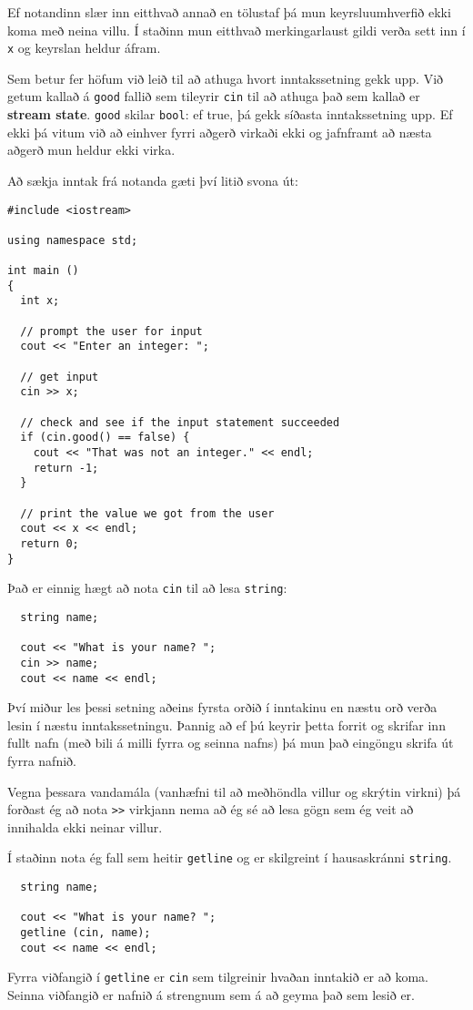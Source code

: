 
Ef notandinn slær inn eitthvað annað en tölustaf þá mun keyrsluumhverfið ekki koma með neina villu.
Í staðinn mun eitthvað merkingarlaust gildi verða sett inn í {\tt x} og keyrslan heldur áfram.

Sem betur fer höfum við leið til að athuga hvort inntakssetning gekk upp.
Við getum kallað á {\tt good} fallið sem tileyrir {\tt cin} til að athuga það sem kallað er {\bf stream state}.
{\tt good} skilar {\tt bool}: ef true, þá gekk síðasta inntakssetning upp.
Ef ekki þá vitum við að einhver fyrri aðgerð virkaði ekki og jafnframt að næsta aðgerð mun heldur ekki virka.

Að sækja inntak frá notanda gæti því litið svona út:

\begin{verbatim}
#include <iostream>

using namespace std;

int main ()
{
  int x;

  // prompt the user for input
  cout << "Enter an integer: ";

  // get input
  cin >> x;

  // check and see if the input statement succeeded
  if (cin.good() == false) {
    cout << "That was not an integer." << endl;
    return -1;
  }

  // print the value we got from the user
  cout << x << endl;
  return 0;
}
\end{verbatim}
%
Það er einnig hægt að nota {\tt cin} til að lesa {\tt string}:

\begin{verbatim}
  string name;

  cout << "What is your name? ";
  cin >> name;
  cout << name << endl;
\end{verbatim}
%
Því miður les þessi setning aðeins fyrsta orðið í inntakinu en næstu orð verða lesin í næstu inntakssetningu.
Þannig að ef þú keyrir þetta forrit og skrifar inn fullt nafn (með bili á milli fyrra og seinna nafns) þá mun það eingöngu skrifa út fyrra nafnið.

Vegna þessara vandamála (vanhæfni til að meðhöndla villur og skrýtin virkni) þá forðast ég að nota {\tt >>} virkjann
nema að ég sé að lesa gögn sem ég veit að innihalda ekki neinar villur.

Í staðinn nota ég fall sem heitir {\tt getline} og er skilgreint í hausaskránni {\tt string}.

\begin{verbatim}
  string name;

  cout << "What is your name? ";
  getline (cin, name);
  cout << name << endl;
\end{verbatim}
%
Fyrra viðfangið í {\tt getline} er {\tt cin} sem tilgreinir hvaðan inntakið er að koma.
Seinna viðfangið er nafnið á strengnum sem á að geyma það sem lesið er.

